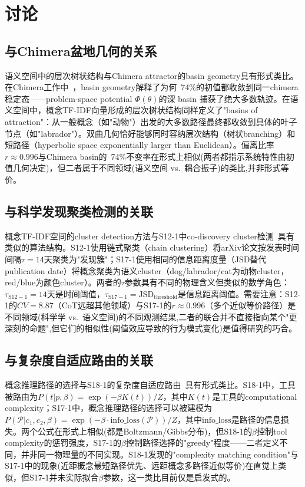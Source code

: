 \documentclass[UTF8,fontset=mac]{ctexart}
\begin{document}
\section{讨论}\label{discussion}

\subsection{与Chimera盆地几何的关系}\label{basin-geometry}

语义空间中的层次树状结构与Chimera attractor的basin geometry具有形式类比。在Chimera工作中~\cite{chimera-stable-attractors-2026}，basin geometry解释了为何~74\%的初值都收敛到同一chimera稳定态------problem-space potential \(\Phi(\theta)\)的深 basin 捕获了绝大多数轨迹。在语义空间中，概念TF-IDF向量形成的层次树状结构同样定义了"basins of attraction"：从一般概念（如"动物"）出发的大多数路径最终都收敛到具体的叶子节点（如"labrador"）。双曲几何恰好能够同时容纳层次结构（树状branching）和短路径（hyperbolic space exponentially larger than Euclidean）。偏离比率\(r\approx 0.996\)与Chimera basin的~74\%不变率在形式上相似(两者都指示系统特性由初值几何决定)，但二者属于不同领域(语义空间 vs.~耦合振子)的类比,并非形式等价。

\subsection{与科学发现聚类检测的关联}\label{discovery-clustering}

概念TF-IDF空间的cluster detection方法与S12-1中co-discovery cluster检测~\cite{s12-1-2026}具有类似的算法结构。S12-1使用链式聚类（chain clustering）将arXiv论文按发表时间间隔\(\tau=14\)天聚类为"发现簇"；S17-1使用相同的信息距离度量（JSD替代publication date）将概念聚类为语义cluster（dog/labrador/cat为动物cluster，red/blue为颜色cluster）。两者的\(\tau\)参数具有不同的物理含义但类似的数学角色：\(\tau_{\mathrm{S12-1}}=14\)天是时间阈值，\(\tau_{\mathrm{S17-1}}=\mathrm{JSD}_{\mathrm{threshold}}\)是信息距离阈值。需要注意：S12-1的\(CV=8.87\)（CoT远超其他领域）与S17-1的\(r\approx 0.996\)（多个近似等价路径）是不同领域(科学学 vs.~语义空间)的不同观测结果,二者的联合并不直接指向某个"更深刻的命题",但它们的相似性(阈值效应导致的行为模式变化)是值得研究的巧合。

\subsection{与复杂度自适应路由的关联}\label{complexity-routing}

概念推理路径的选择与S18-1的复杂度自适应路由~\cite{s18-1-2026}具有形式类比。S18-1中，工具被路由为\(P(t|p,\beta)=\exp(-\beta K(t))/Z\)，其中\(K(t)\)是工具的computational complexity；S17-1中，概念推理路径的选择可以被建模为\(P(\mathcal{P}|c_1,c_2,\beta)=\exp(-\beta \cdot \mathrm{info\_loss}(\mathcal{P}))/Z\)，其中\(\mathrm{info\_loss}\)是路径的信息损失。两个公式在形式上相似(都是Boltzmann/Gibbs分布)，但S18-1的\(\beta\)控制tool complexity的惩罚强度，S17-1的\(\beta\)控制路径选择的"greedy"程度------二者定义不同，并非同一物理量的不同实现。S18-1发现的"complexity matching condition"与S17-1中的现象(近距概念最短路径优先、远距概念多路径近似等价)在直觉上类似，但S17-1并未实际拟合\(\beta\)参数，这一类比目前仅是启发式的。
\end{document}
